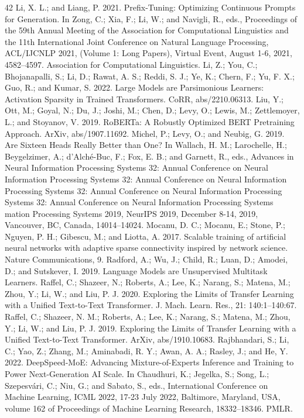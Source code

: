 \documentclass[conference]{IEEEtran}
\begin{document}
\begin{thebibliography}{42}
 Li, X. L.; and Liang, P. 2021. Prefix-Tuning: Optimizing Continuous Prompts for Generation. In Zong, C.; Xia, F.; Li, W.; and Navigli, R., eds., Proceedings of the 59th Annual Meeting of the Association for Computational Linguistics and the 11th International Joint Conference on Natural Language Processing, ACL/IJCNLP 2021, (Volume 1: Long Papers), Virtual Event, August 1-6, 2021, 4582–4597. Association for Computational Linguistics.
 Li, Z.; You, C.; Bhojanapalli, S.; Li, D.; Rawat, A. S.; Reddi, S. J.; Ye, K.; Chern, F.; Yu, F. X.; Guo, R.; and Kumar, S. 2022. Large Models are Parsimonious Learners: Activation Sparsity in Trained Transformers. CoRR, abs/2210.06313.
 Liu, Y.; Ott, M.; Goyal, N.; Du, J.; Joshi, M.; Chen, D.; Levy, O.; Lewis, M.; Zettlemoyer, L.; and Stoyanov, V. 2019. RoBERTa: A Robustly Optimized BERT Pretraining Approach. ArXiv, abs/1907.11692.
 Michel, P.; Levy, O.; and Neubig, G. 2019. Are Sixteen Heads Really Better than One? In Wallach, H. M.; Larochelle, H.; Beygelzimer, A.; d'Alché-Buc, F.; Fox, E. B.; and Garnett, R., eds., Advances in Neural Information Processing Systems 32: Annual Conference on Neural Information Processing Systems 32: Annual Conference on Neural Information Processing Systems 32: Annual Conference on Neural Information Processing Systems 32: Annual Conference on Neural Information Processing Systems
 mation Processing Systems 2019, NeurIPS 2019, December 8-14, 2019, Vancouver, BC, Canada, 14014–14024.
 Mocanu, D. C.; Mocanu, E.; Stone, P.; Nguyen, P. H.; Gibescu, M.; and Liotta, A. 2017. Scalable training of artificial neural networks with adaptive sparse connectivity inspired by network science. Nature Communications, 9.
 Radford, A.; Wu, J.; Child, R.; Luan, D.; Amodei, D.; and Sutskever, I. 2019. Language Models are Unsupervised Multitask Learners.
 Raffel, C.; Shazeer, N.; Roberts, A.; Lee, K.; Narang, S.; Matena, M.; Zhou, Y.; Li, W.; and Liu, P. J. 2020. Exploring the Limits of Transfer Learning with a Unified Text-to-Text Transformer. J. Mach. Learn. Res., 21: 140:1–140:67.
 Raffel, C.; Shazeer, N. M.; Roberts, A.; Lee, K.; Narang, S.; Matena, M.; Zhou, Y.; Li, W.; and Liu, P. J. 2019. Exploring the Limits of Transfer Learning with a Unified Text-to-Text Transformer. ArXiv, abs/1910.10683.
 Rajbhandari, S.; Li, C.; Yao, Z.; Zhang, M.; Aminabadi, R. Y.; Awan, A. A.; Rasley, J.; and He, Y. 2022. DeepSpeed-MoE: Advancing Mixture-of-Experts Inference and Training to Power Next-Generation AI Scale. In Chaudhuri, K.; Jegelka, S.; Song, L.; Szepesvári, C.; Niu, G.; and Sabato, S., eds., International Conference on Machine Learning, ICML 2022, 17-23 July 2022, Baltimore, Maryland, USA, volume 162 of Proceedings of Machine Learning Research, 18332–18346. PMLR.

\end{thebibliography}
\end{document}
